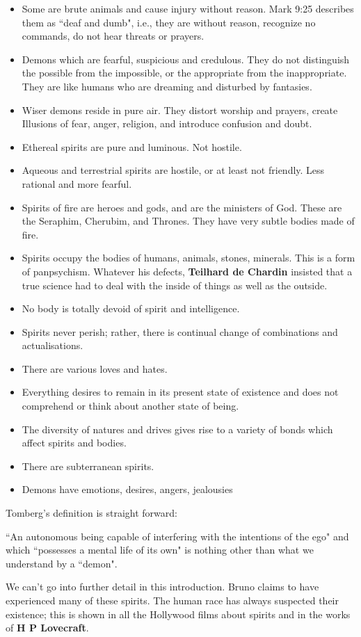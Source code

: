 \begin{itemize}
\item Some are brute animals and cause injury without reason. Mark 9:25 describes them as ``deaf and dumb", i.e., they are without reason, recognize no commands, do not hear threats or prayers. 
\item Demons which are fearful, suspicious and credulous. They do not distinguish the possible from the impossible, or the appropriate from the inappropriate. They are like humans who are dreaming and disturbed by fantasies. 
\item Wiser demons reside in pure air. They distort worship and prayers, create Illusions of fear, anger, religion, and introduce confusion and doubt. 
\item Ethereal spirits are pure and luminous. Not hostile. 
\item Aqueous and terrestrial spirits are hostile, or at least not friendly. Less rational and more fearful. 
\item Spirits of fire are heroes and gods, and are the ministers of God. These are the Seraphim, Cherubim, and Thrones. They have very subtle bodies made of fire. 
\item Spirits occupy the bodies of humans, animals, stones, minerals. This is a form of panpsychism. Whatever his defects, \textbf{Teilhard de Chardin} insisted that a true science had to deal with the inside of things as well as the outside. 
\item No body is totally devoid of spirit and intelligence. 
\item Spirits never perish; rather, there is continual change of combinations and actualisations. 
\item There are various loves and hates. 
\item Everything desires to remain in its present state of existence and does not comprehend or think about another state of being. 
\item The diversity of natures and drives gives rise to a variety of bonds which affect spirits and bodies. 
\item There are subterranean spirits. 
\item Demons have emotions, desires, angers, jealousies 
\end{itemize}
Tomberg's definition is straight forward:

\begin{quotex}
``An autonomous being capable of interfering with the intentions of the ego" and which ``possesses a mental life of its own" is nothing other than what we understand by a ``demon".

\end{quotex}
We can't go into further detail in this introduction. Bruno claims to have experienced many of these spirits. The human race has always suspected their existence; this is shown in all the Hollywood films about spirits and in the works of \textbf{H P Lovecraft}.

